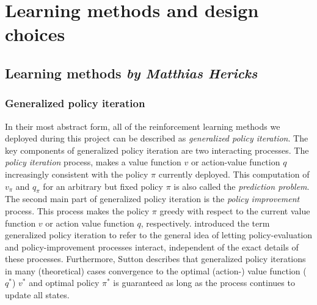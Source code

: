 \chapter{Learning methods and design choices}
\section[Learning method]{Learning methods \hfill \small \normalfont\textit{by Matthias Hericks}}

\subsection{Generalized policy iteration}

In their most abstract form, all of the reinforcement learning methods we deployed during this project can be described as \emph{generalized policy iteration}. The key components of generalized policy iteration are two interacting processes. The \emph{policy iteration} process, makes a value function $v$ or action-value function $q$ increasingly consistent with the policy $\pi$ currently deployed. This computation of $v_\pi$ and $q_\pi$ for an arbitrary but fixed policy $\pi$ is also called the \emph{prediction problem}. The second main part of generalized policy iteration is the \emph{policy improvement} process. This process makes the policy $\pi$ greedy with respect to the current value function $v$ or action value function $q$, respectively. \cite{Sutton1998} introduced the term generalized policy iteration to refer to the general idea of letting policy-evaluation and policy-improvement processes interact, independent of the exact details of these processes. Furthermore, Sutton describes that generalized policy iterations in many (theoretical) cases convergence to the optimal (action-) value function ($q^\ast$) $v^\ast$ and optimal policy $\pi^\ast$ is guaranteed as long as the process continues to update all states. 


